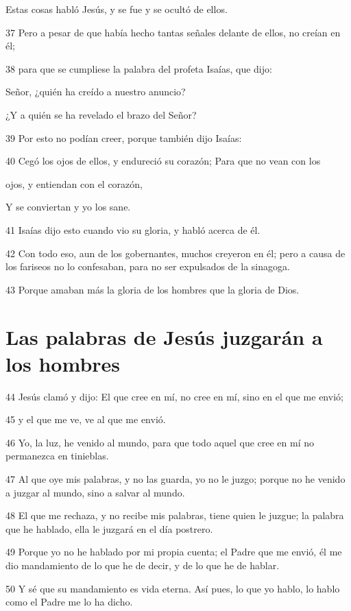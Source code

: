 \par Estas cosas habló Jesús, y se fue y se ocultó de ellos.
\par 37 Pero a pesar de que había hecho tantas señales delante de ellos, no creían en él;
\par 38 para que se cumpliese la palabra del profeta Isaías, que dijo:
\par Señor, ¿quién ha creído a nuestro anuncio?
\par ¿Y a quién se ha revelado el brazo del Señor?
\par 39 Por esto no podían creer, porque también dijo Isaías:
\par 40 Cegó los ojos de ellos, y endureció su corazón; Para que no vean con los
\par ojos, y entiendan con el corazón,
\par Y se conviertan y yo los sane.
\par 41 Isaías dijo esto cuando vio su gloria, y habló acerca de él.
\par 42 Con todo eso, aun de los gobernantes, muchos creyeron en él; pero a causa de los fariseos no lo confesaban, para no ser expulsados de la sinagoga.
\par 43 Porque amaban más la gloria de los hombres que la gloria de Dios.

\section*{Las palabras de Jesús juzgarán a los hombres}

\par 44 Jesús clamó y dijo: El que cree en mí, no cree en mí, sino en el que me envió;
\par 45 y el que me ve, ve al que me envió.
\par 46 Yo, la luz, he venido al mundo, para que todo aquel que cree en mí no permanezca en tinieblas.
\par 47 Al que oye mis palabras, y no las guarda, yo no le juzgo; porque no he venido a juzgar al mundo, sino a salvar al mundo.
\par 48 El que me rechaza, y no recibe mis palabras, tiene quien le juzgue; la palabra que he hablado, ella le juzgará en el día postrero.
\par 49 Porque yo no he hablado por mi propia cuenta; el Padre que me envió, él me dio mandamiento de lo que he de decir, y de lo que he de hablar.
\par 50 Y sé que su mandamiento es vida eterna. Así pues, lo que yo hablo, lo hablo como el Padre me lo ha dicho.


